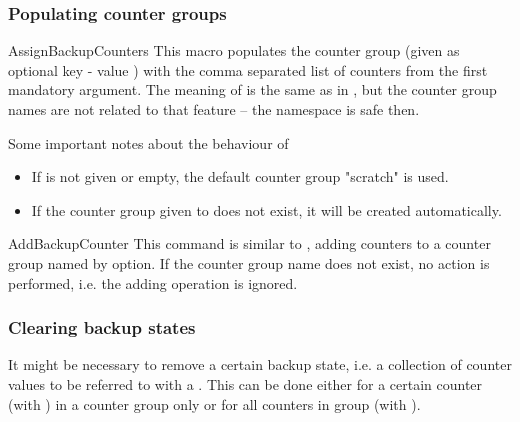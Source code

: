 \documentclass[12pt,a4paper,oneside]{article}
\makeatletter
\newcommand{\chdocextractversion}[1]{%
  \@nameuse{#1}%
}
\newcommand{\CHDocNew}[1]{%
  \tcbdocmarginnote[doclang/new={N},
  colframe=blue,
  halign=left,
  colback={blue!20!white},
  fontupper={\tiny}
  ]{%
    \chdocextractversion{xassoccntversion#1}%
  }%
}
\makeatother
\begin{document}
\subsubsection{Populating counter groups}

\begin{docCommand}[before={\CHDocNew{1.0}}]{AssignBackupCounters}{}
  This macro populates the counter group (given as optional key - value ) with the comma separated list of counters from the first mandatory argument. The meaning of  is the same as in , but the counter group names are not related to that feature -- the namespace is safe then.
  
  Some important notes about the behaviour of 
  \begin{itemize}
  \item If  is not given or empty, the default counter group "scratch" is used. 
    
  \item If the counter group given to  does not exist, it will be created automatically. 
  \end{itemize}
  
\end{docCommand}


\begin{docCommand}[before={\CHDocNew{1.0}}]{AddBackupCounter}{}
  This command is similar to , adding counters to a counter group named by  option. If the counter group name does not exist, no action is performed, i.e. the adding operation is ignored. 
\end{docCommand}


\subsubsection[Clearing backup states]{Clearing backup states}\label{subsubsec::clearingbackupstates}

It might be necessary to remove a certain backup state, i.e. a collection of counter values to be referred to with a . This can be done either for a certain counter (with ) in a counter group only or for all counters in group (with ).
\end{document}
